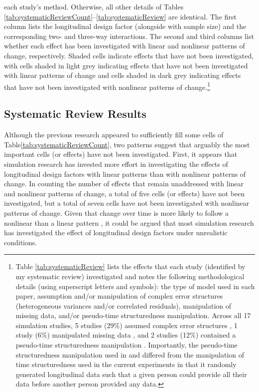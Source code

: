\documentclass[
12pt, %
twoside,
english]{guelphthesis}
\begin{document}
\noindent each study's method. Otherwise, all other details of Tables \ref{tab:systematicReviewCount}--\ref{tab:systematicReview} are identical. The first column lists the longitudinal design factor (alongside with sample size) and the corresponding two- and three-way interactions. The second and third columns list whether each effect has been investigated with linear and nonlinear patterns of change, respectively. Shaded cells indicate effects that have not been investigated, with cells shaded in light grey indicating effects that have not been investigated with linear patterns of change and cells shaded in dark grey indicating effects that have not been investigated with nonlinear patterns of change.\footnote{Table \ref{tab:systematicReview} lists the effects that each study (identified by my systematic review) investigated and notes the following methodological details (using superscript letters and symbols): the type
of model used in each paper, assumption and/or manipulation of complex error structures
(heterogeneous variances and/or correlated residuals), manipulation of missing data,
and/or pseudo-time structuredness manipulation. Across all 17 simulation studies, 5 studies (29\%) assumed complex error structures \parencites{gasimova2014}{liu2021}{liu2015}{miller2017}{murphy2011}, 1 study (6\%) manipulated missing data \parencite{fine2019}, and 2 studies (12\%) contained a pseudo-time structuredness manipulation \parencites{fine2019}{fine2020}. Importantly, the pseudo-time structuredness manipulation used in \textcite{fine2019} and \textcite{fine2020} differed from the manipulation of time structuredness used in the current experiments \parencites[and from previous simulation experiments of][]{coulombe2016}{miller2017} in that it randomly generated longitudinal data such that a given person could provide all their data before another person provided any data.}

\hypertarget{systematic-review-results}{%
\subsection{Systematic Review Results}\label{systematic-review-results}}

Although the previous research appeared to sufficiently fill some cells of Table\ref{tab:systematicReviewCount}, two patterns suggest that arguably the most important cells (or effects) have not been investigated. First, it appears that simulation research has invested more effort in investigating the effects of longitudinal design factors with linear patterns than with nonlinear patterns of change. In counting the number of effects that remain unaddressed with linear and nonlinear patterns of change, a total of five cells (or effects) have not been investigated, but a total of seven cells have not been investigated with nonlinear patterns of change. Given that change over time is more likely to follow a nonlinear than a linear pattern \autocite[for a review, see][]{cudeck2007}, it could be argued that most simulation research has investigated the effect of longitudinal design factors under unrealistic conditions.
\end{document}
